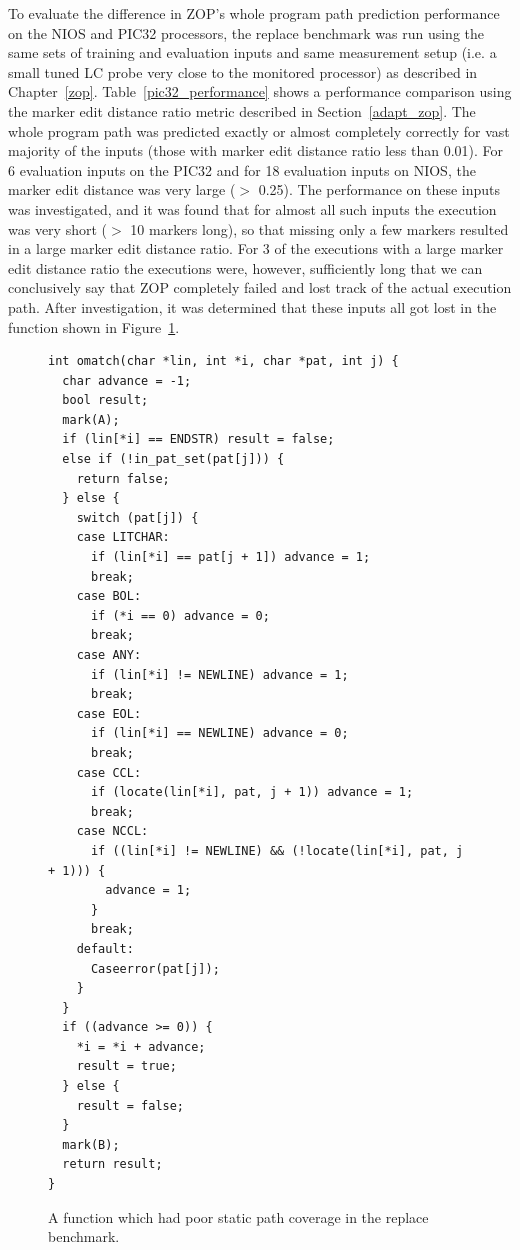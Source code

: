 To evaluate the difference in ZOP's whole program path prediction performance on the NIOS and PIC32 processors, the replace benchmark was run using the same sets of training and evaluation inputs and same measurement setup (i.e. a small tuned LC probe very close to the monitored processor) as described in Chapter~\ref{zop}. Table~\ref{pic32_performance} shows a performance comparison using the marker edit distance ratio metric described in Section~\ref{adapt_zop}. The whole program path was predicted exactly or almost completely correctly for vast majority of the inputs (those with marker edit distance ratio less than 0.01). For 6 evaluation inputs on the PIC32 and for 18 evaluation inputs on NIOS, the marker edit distance was very large ($>$ 0.25). The performance on these inputs was investigated, and it was found that for almost all such inputs the execution was very short ($>$ 10 markers long), so that missing only a few markers resulted in a large marker edit distance ratio. For 3 of the executions with a large marker edit distance ratio the executions were, however, sufficiently long that we can conclusively say that ZOP completely failed and lost track of the actual execution path. After investigation, it was determined that these inputs all got lost in the function shown in Figure~\ref{replace_omatch}.

\begin{figure}[h]
  \centering
\lstset{language=C++,basicstyle=\ttfamily\scriptsize,numbers=left}
\begin{lstlisting}[frame=none,xleftmargin=30pt]
int omatch(char *lin, int *i, char *pat, int j) {
  char advance = -1;
  bool result;
  mark(A);
  if (lin[*i] == ENDSTR) result = false;
  else if (!in_pat_set(pat[j])) {
    return false;
  } else {
    switch (pat[j]) {
    case LITCHAR:
      if (lin[*i] == pat[j + 1]) advance = 1;
      break;
    case BOL:
      if (*i == 0) advance = 0;
      break;
    case ANY:
      if (lin[*i] != NEWLINE) advance = 1;
      break;
    case EOL:
      if (lin[*i] == NEWLINE) advance = 0;
      break;
    case CCL:
      if (locate(lin[*i], pat, j + 1)) advance = 1;
      break;
    case NCCL:
      if ((lin[*i] != NEWLINE) && (!locate(lin[*i], pat, j + 1))) {
        advance = 1;
      }
      break;
    default:
      Caseerror(pat[j]);
    }
  }
  if ((advance >= 0)) {
    *i = *i + advance;
    result = true;
  } else {
    result = false;
  }
  mark(B);
  return result;
}
\end{lstlisting}
\caption{A function which had poor static path coverage in the replace benchmark.}\label{replace_omatch}
\end{figure}

